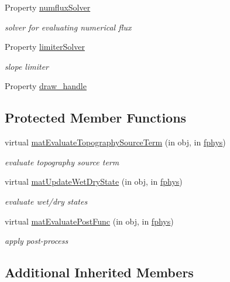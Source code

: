 \begin{DoxyCompactItemize}
Property \hyperlink{class_s_w_e_abstract1d_a52581228d842808bcf60f0efda70eac7}{numflux\+Solver}
\begin{DoxyCompactList}\small\item\em solver for evaluating numerical flux \end{DoxyCompactList}\item 
Property \hyperlink{class_s_w_e_abstract1d_a909aca166dcba19c4908aacdb04f5c44}{limiter\+Solver}
\begin{DoxyCompactList}\small\item\em slope limiter \end{DoxyCompactList}\item 
Property \hyperlink{class_s_w_e_abstract1d_aa89afba8994c2523cf31f3f7c0dae222}{draw\+\_\+handle}
\end{DoxyCompactItemize}
\subsection*{Protected Member Functions}
\begin{DoxyCompactItemize}
\item 
virtual \hyperlink{class_s_w_e_abstract1d_ab9b6397c6fc87e6400b62173b1122af7}{mat\+Evaluate\+Topography\+Source\+Term} (in obj, in \hyperlink{class_ndg_phys_a6b25724fc9474d32018439009072f0a9}{fphys})
\begin{DoxyCompactList}\small\item\em evaluate topography source term \end{DoxyCompactList}\item 
virtual \hyperlink{class_s_w_e_abstract1d_a5e00f5c2415bfaec0463cad39a4eb0da}{mat\+Update\+Wet\+Dry\+State} (in obj, in \hyperlink{class_ndg_phys_a6b25724fc9474d32018439009072f0a9}{fphys})
\begin{DoxyCompactList}\small\item\em evaluate wet/dry states \end{DoxyCompactList}\item 
virtual \hyperlink{class_s_w_e_abstract1d_ab33af58d0e4c4101a42d45581365121a}{mat\+Evaluate\+Post\+Func} (in obj, in \hyperlink{class_ndg_phys_a6b25724fc9474d32018439009072f0a9}{fphys})
\begin{DoxyCompactList}\small\item\em apply post-\/process \end{DoxyCompactList}\end{DoxyCompactItemize}
\subsection*{Additional Inherited Members}


